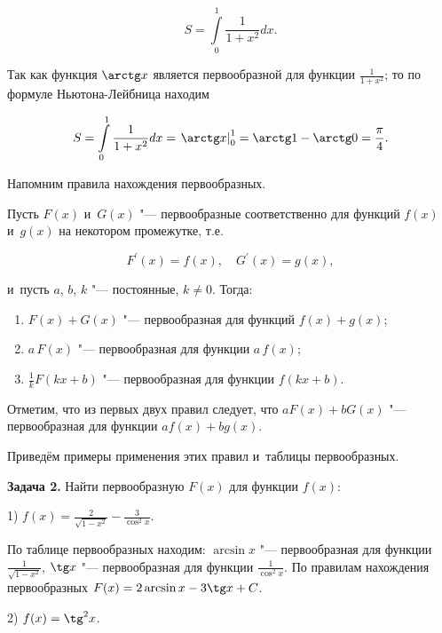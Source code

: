 \begin{equation*}
\displaystyle S = \int\limits_{0}^{1} \frac{1}{1 + x^{2}} dx.
\end{equation*}

Так как функция $\arctg x$ является первообразной для функции
$\displaystyle \frac{1}{1 + x^{2}}$; то по формуле Ньютона-Лейбница находим

\begin{equation*}
\displaystyle S = \int\limits_{0}^{1} \frac{1}{1 + x^{2}} dx = 
\left . \arctg x \right|_{0}^{1} = \arctg 1 - \arctg 0 = \frac{\pi}{4}.
\end{equation*}

Напомним правила нахождения первообразных.

Пусть $F(x)$ и~$G(x)$ "--- первообразные соответственно для функций $f(x)$ и~$g(x)$
на некотором промежутке, т.е.\

\begin{equation*}
F^\prime (x) = f(x), \quad G^\prime (x) = g(x),
\end{equation*}

\noindent
и~пусть $a$, $b$, $k$ "--- постоянные, $k \ne 0$. Тогда:

\begin{enumerate}
\item\label{lst:5_7_1_1} $F(x) + G(x)$ "--- первообразная для функций $f(x) + g(x)$;
\item\label{lst:5_7_1_2} $a\,F(x)$ "--- первообразная для функции $a\,f(x)$;
\item\label{lst:5_7_1_3} $\displaystyle \frac{1}{k}F(kx+ b)$ "--- первообразная для функции $f(kx + b)$.
\end{enumerate}

Отметим, что из первых двух правил следует, что $aF(x) + bG(x)$ "--- первообразная
для функции $af(x) + bg(x)$.

Приведём примеры применения этих правил и~таблицы первообразных.

\textbf{Задача 2.}\label{ex:5_7_2} Найти первообразную $F(x)$ для функции $f(x)$:

1) $\displaystyle f(x) = \frac{2}{\sqrt{1 - x^{2}}} - \frac{3}{\cos^{2} x}$.

По таблице первообразных находим: $\arcsin x$ "--- первообразная для функции
$\displaystyle \frac{1}{\sqrt{1 - x^{2}}}$, $\tg x$ "--- первообразная для функции
$\displaystyle \frac{1}{\cos^{2} x}$. По правилам нахождения первообразных
$F(x) = 2\arcsin x - 3\tg x + C$.

2) $f(x) = \tg^{2} x$.

